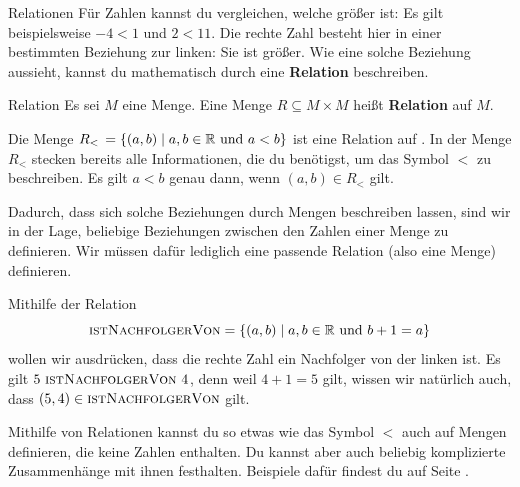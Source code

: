 \documentclass[../../main.tex]{subfiles}
\begin{document}
\begin{advanced}{Relationen}
    Für Zahlen kannst du vergleichen, welche größer ist: Es gilt beispielsweise $-4<1$ und $2<11$. Die rechte Zahl besteht hier in einer bestimmten Beziehung zur linken: Sie ist größer. Wie eine solche Beziehung aussieht, kannst du mathematisch durch eine \textbf{Relation} beschreiben.

    \begin{definition}{Relation}
        Es sei $M$ eine Menge. Eine Menge $R\subseteq M \times M$ heißt \textbf{Relation} auf $M$.
    \end{definition}

    Die Menge $R_<\,=\{(a,b)\mid a,b\in\mathbb{R}~\text{und}~a<b\}$ ist eine Relation auf \Real. In der Menge $R_<$ stecken bereits alle Informationen, die du benötigst, um das Symbol $<$ zu beschreiben. Es gilt $a<b$ genau dann, wenn $(a,b)\in R_<$ gilt.

    Dadurch, dass sich solche Beziehungen durch Mengen beschreiben lassen, sind wir in der Lage, beliebige Beziehungen zwischen den Zahlen einer Menge zu definieren. Wir müssen dafür lediglich eine passende Relation (also eine Menge) definieren.

    \begin{advexample}{}
        Mithilfe der Relation \[\textsc{istNachfolgerVon}=\{(a,b)\mid a,b\in\mathbb{R}\text{~und~}b+1=a\}\]
        wollen wir ausdrücken, dass die rechte Zahl ein Nachfolger von der linken ist. Es gilt $5~\textsc{istNachfolgerVon}~4$, denn weil $4+1=5$ gilt, wissen wir natürlich auch, dass $(5,4)\in\textsc{istNachfolgerVon}$ gilt.
    \end{advexample}
    Mithilfe von Relationen kannst du so etwas wie das Symbol $<$ auch auf Mengen definieren, die keine Zahlen enthalten. Du kannst aber auch beliebig komplizierte Zusammenhänge mit ihnen festhalten. Beispiele dafür findest du auf Seite \pageref{relationen}.
\end{advanced}
\end{document}
